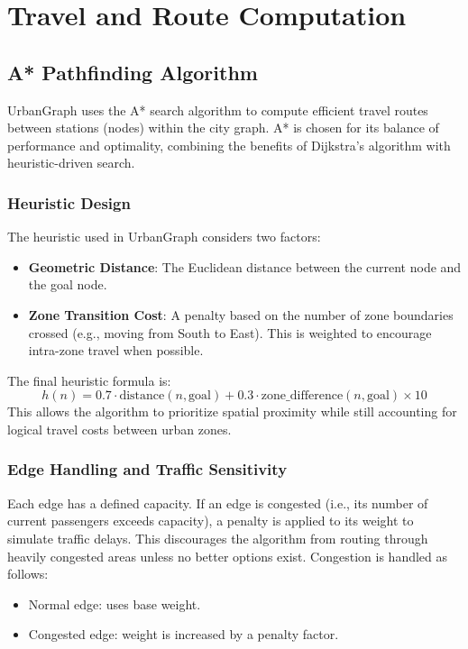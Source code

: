 \documentclass[12pt]{article}
\begin{document}

\section{Travel and Route Computation}
\subsection{A* Pathfinding Algorithm}

UrbanGraph uses the A* search algorithm to compute efficient travel routes between stations (nodes) within the city graph. A* is chosen for its balance of performance and optimality, combining the benefits of Dijkstra's algorithm with heuristic-driven search.

\subsubsection*{Heuristic Design}

The heuristic used in UrbanGraph considers two factors:
\begin{itemize}
    \item \textbf{Geometric Distance}: The Euclidean distance between the current node and the goal node.
    \item \textbf{Zone Transition Cost}: A penalty based on the number of zone boundaries crossed (e.g., moving from South to East). This is weighted to encourage intra-zone travel when possible.
\end{itemize}

The final heuristic formula is:
\[
h(n) = 0.7 \cdot \text{distance}(n, \text{goal}) + 0.3 \cdot \text{zone\_difference}(n, \text{goal}) \times 10
\]
This allows the algorithm to prioritize spatial proximity while still accounting for logical travel costs between urban zones.

\subsubsection*{Edge Handling and Traffic Sensitivity}

Each edge has a defined capacity. If an edge is congested (i.e., its number of current passengers exceeds capacity), a penalty is applied to its weight to simulate traffic delays. This discourages the algorithm from routing through heavily congested areas unless no better options exist. Congestion is handled as follows:
\begin{itemize}
    \item Normal edge: uses base weight.
    \item Congested edge: weight is increased by a penalty factor.
\end{itemize}
\end{document}
